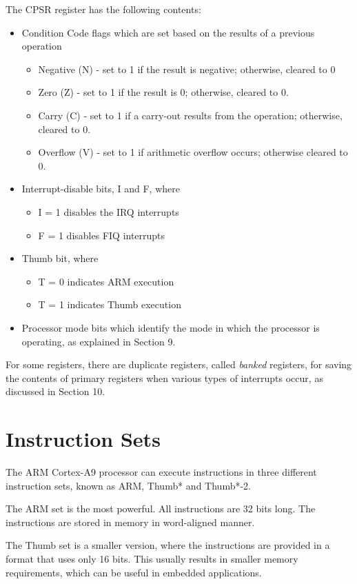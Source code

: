 \documentclass[11pt, twoside, pdftex]{article}
\begin{document}
The CPSR register has the following contents:
\begin{itemize}
\item Condition Code flags which are set based on the results
of a previous operation
\begin{itemize}
\item Negative (N) - set to 1 if the result is negative;
otherwise, cleared to 0
\item Zero (Z) - set to 1 if the result is 0; otherwise,
cleared to 0.
\item Carry (C) - set to 1 if a carry-out results from the
operation; otherwise, cleared to 0.
\item Overflow (V) - set to 1 if arithmetic overflow occurs;
otherwise cleared to 0.
\end{itemize}
\item Interrupt-disable bits, I and F, where
\begin{itemize}
\item I = 1 disables the IRQ interrupts
\item F = 1 disables FIQ interrupts
\end{itemize}
\item Thumb bit, where
\begin{itemize}
\item T = 0 indicates ARM execution
\item T = 1 indicates Thumb execution
\end{itemize}
\item Processor mode bits which identify the mode in which
the processor is operating, as explained in Section 9.
\end{itemize}
 
For some registers, there are duplicate registers, called
{\it banked} registers, for saving 
the contents of primary registers when various types of
interrupts occur, as discussed in Section 10.

\section{Instruction Sets}

The ARM Cortex-A9 processor can execute instructions in three
different instruction sets, known as ARM, Thumb* and Thumb*-2.

The ARM set is the most powerful. All instructions
are 32 bits long. The instructions are stored in memory in
word-aligned manner.

The Thumb set is a smaller version, where the 
instructions are provided in a format that uses only 16 bits.
This usually results in smaller memory requirements, which can be
useful in embedded applications.
\end{document}
